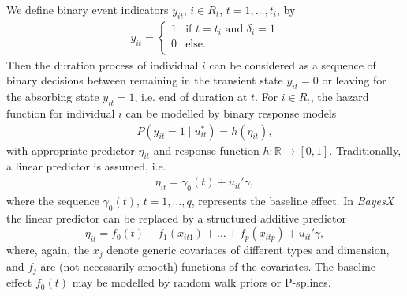 \documentclass[11pt,a4paper,twoside]{bayesxarticle}
\def \re {\mathds{R}}
\begin{document}
We define binary event indicators $y_{it}$, $i\in R_{t}$,
$t=1,\ldots,t_{i}$, by
\begin{eqnarray*}
  y_{it}=
   \left \{ \begin{array}{ll}
             1 & \mbox{if $t=t_{i}$ and $\delta_{i}=1$}\\
             0 & \mbox{else}.\\
          \end{array}   \right.
\end{eqnarray*}
Then the duration process of individual $i$ can be considered as a
sequence of binary decisions between remaining in the transient
state $y_{it}=0$ or leaving for the absorbing state $y_{it}=1$,
i.e. end of duration at $t$. For $i \in R_{t}$, the hazard
function for individual $i$ can be modelled by binary response
models
\begin{eqnarray} \label{gleichung1}
 P(y_{it}=1\mid u_{it}^*)=h(\eta_{it}),
\end{eqnarray}
with appropriate predictor $\eta_{it}$ and response function $h: \re
\rightarrow [0,1]$. Traditionally, a linear predictor is assumed,
i.e.
\begin{eqnarray} \label{gleichung2}
\eta_{it}= \gamma_{0}(t)+u_{it}' \gamma,
\end{eqnarray}
where the sequence ${\gamma_{0}(t),\, t=1,\ldots,q}$, represents the
baseline effect. In {\em BayesX} the linear predictor can be
replaced by a structured additive predictor
\begin{equation}
\label{gampred2} \eta_{it}=f_0(t) +
f_{1}(x_{it1})+\dots+f_{p}(x_{itp})+u_{it}'\gamma,
\end{equation}
where, again, the $x_j$ denote generic covariates of different types
and dimension, and $f_j$ are (not necessarily smooth) functions of
the covariates. The baseline effect $f_0(t)$ may be modelled by
random walk priors or P-splines.
\end{document}
